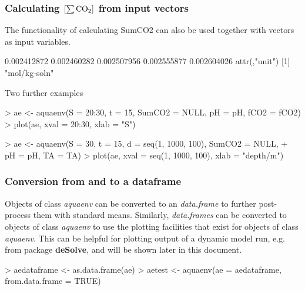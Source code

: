 \documentclass[article,nojss]{jss}
\newcommand{\R}{\proglang{R }}
\newcommand{\ds}{\textbf{\textsf{deSolve}}}
\begin{document}
\subsubsection{Calculating $\rm [\sum CO_2]$ from input vectors}

The functionality of calculating SumCO2 can also be used together with vectors as input variables.

\begin{Schunk}
\begin{Soutput}
[1] 0.002412872 0.002460282 0.002507956 0.002555877 0.002604026
attr(,"unit")
[1] "mol/kg-soln"
\end{Soutput}
\end{Schunk}

Two further examples

\begin{Schunk}
\begin{Sinput}
> ae <- aquaenv(S = 20:30, t = 15, SumCO2 = NULL, pH = pH, fCO2 = fCO2)
> plot(ae, xval = 20:30, xlab = "S")
\end{Sinput}
\end{Schunk}

\begin{Schunk}
\begin{Sinput}
> ae <- aquaenv(S = 30, t = 15, d = seq(1, 1000, 100), SumCO2 = NULL, 
+     pH = pH, TA = TA)
> plot(ae, xval = seq(1, 1000, 100), xlab = "depth/m")
\end{Sinput}
\end{Schunk}



\subsubsection{Conversion from and to a dataframe}
Objects of class \textit{aquaenv} can be converted to an \R \textit{data.frame} to further post-process them with standard
\R means. Similarly, \R \textit{data.frames} can be converted to objects of class \textit{aquaenv} to use the plotting 
facilities that exist for objects of class \textit{aquaenv}. This can be helpful for plotting output of a dynamic model run, e.g. from \R package \ds,
and will be shown later in this document.

\begin{Schunk}
\begin{Sinput}
> aedataframe <- as.data.frame(ae)
> aetest <- aquaenv(ae = aedataframe, from.data.frame = TRUE)
\end{Sinput}
\end{Schunk}
\end{document}
